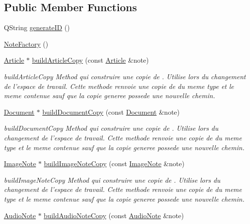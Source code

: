 \subsection*{Public Member Functions}
\begin{DoxyCompactItemize}
\item 
Q\-String \hyperlink{class_note_factory_af3782bcfb2df5226f3fe49a9398aa08c}{generate\-I\-D} ()
\item 
\hyperlink{class_note_factory_a58635a5e10606671aaeb3b4a44cb301a}{Note\-Factory} ()
\item 
\hyperlink{class_article}{Article} $\ast$ \hyperlink{class_note_factory_a3b6a6b85845325b916eee41fd7d6f0d8}{build\-Article\-Copy} (const \hyperlink{class_article}{Article} \&note)
\begin{DoxyCompactList}\small\item\em build\-Article\-Copy Method qui construire une copie de . Utilise lors du changement de l'espace de travail. Cette methode renvoie une copie de  du meme type et le meme contenue sauf que la copie generee possede une nouvelle chemin. \end{DoxyCompactList}\item 
\hyperlink{class_document}{Document} $\ast$ \hyperlink{class_note_factory_a642a99db2542efec7708cecba27b520a}{build\-Document\-Copy} (const \hyperlink{class_document}{Document} \&note)
\begin{DoxyCompactList}\small\item\em build\-Document\-Copy Method qui construire une copie de . Utilise lors du changement de l'espace de travail. Cette methode renvoie une copie de  du meme type et le meme contenue sauf que la copie generee possede une nouvelle chemin. \end{DoxyCompactList}\item 
\hyperlink{class_image_note}{Image\-Note} $\ast$ \hyperlink{class_note_factory_a813c0500c87853799201b03efce7aec6}{build\-Image\-Note\-Copy} (const \hyperlink{class_image_note}{Image\-Note} \&note)
\begin{DoxyCompactList}\small\item\em build\-Image\-Note\-Copy Method qui construire une copie de . Utilise lors du changement de l'espace de travail. Cette methode renvoie une copie de  du meme type et le meme contenue sauf que la copie generee possede une nouvelle chemin. \end{DoxyCompactList}\item 
\hyperlink{class_audio_note}{Audio\-Note} $\ast$ \hyperlink{class_note_factory_a7897d30151e801aca317619bf3f1676f}{build\-Audio\-Note\-Copy} (const \hyperlink{class_audio_note}{Audio\-Note} \&note)

\end{DoxyCompactItemize}
